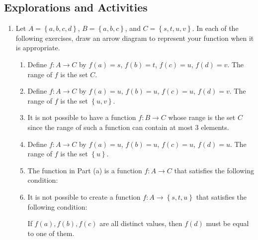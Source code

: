 \subsection*{Explorations and Activities}
\setcounter{oldenumi}{\theenumi}
\begin{enumerate} \setcounter{enumi}{\theoldenumi}
\item Let  $A = \left\{ {a, b, c, d} \right\}$, $B = \left\{ {a, b, c} \right\}$, and  
$C = \left\{ {s, t, u, v} \right\}$.  In each of the following exercises, draw an arrow diagram to represent your function when it is appropriate.

\begin{enumerate}
\item Define  $f:A \to C$  by  $f( a ) = s$, $f( b ) = t$, 
$f( c ) = u$, $f( d ) = v$.  The range of  $f$  is the set  $C$. 

\item Define  $f:A \to C$  by  $f( a ) = u$, $f( b ) = u$, 
$f( c ) = u$, $f( d ) = v$.  The range of  $f$  is the set   
$\left\{ {u, v} \right\}$.

\item It is not possible to have a function  $f:B \to C$ whose range is the set   $C$  since the range of such a function can contain at most 3 elements.

\item Define  $f:A \to C$  by  $f( a ) = u$, $f( b ) = u$, 
$f( c ) = u$, $f( d ) = u$.  The range of  $f$  is the set   
$\left\{ u \right\}$.

\item The function in Part (a) is a function  $f:A \to C$  that satisfies the following condition:


\item It is not possible to create a function  $f:A \to \left\{ {s, t, u} \right\}$ that satisfies the following condition:


If  $f( a ), f( b ), f( c )$ are all distinct values, then  
$f( d )$ must be equal to one of them.
\end{enumerate}


\end{enumerate}


\hbreak
\endinput


